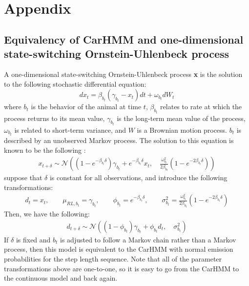 
\renewcommand*{\thesubsection}{\Alph{subsection}}

\section*{Appendix}

\setcounter{subsection}{0}

\subsection{Equivalency of CarHMM and one-dimensional state-switching Ornstein-Uhlenbeck process}

A one-dimensional state-switching Ornstein-Uhlenbeck process \textbf{x} is the solution to the following stochastic differential equation:
%
$$dx_t = \beta_{b_t}(\gamma_{b_t} - x_t)dt + \omega_{b_t} dW_t$$
%
where $b_t$ is the behavior of the animal at time $t$, $\beta_{b_t}$ relates to rate at which the process returns to its mean value, $\gamma_{b_t}$ is the long-term mean value of the process, $\omega_{b_t}$ is related to short-term variance, and $W$ is a Brownian motion process. $b_t$ is described by an unobserved Markov process. The solution to this equation is known to be the following \cite{Michelot:2019}:
\begin{align*}
	x_{t+\delta} \sim \mathcal{N}\left((1-e^{-\beta_{b_t}\delta})\gamma_{b_t} + e^{-\beta_{b_t}\delta} x_t,\quad \frac{\omega_{b_t}^2}{2\beta_{b_t}} (1-e^{-2\beta_{b_t}\delta})\right)
\end{align*}
suppose that $\delta$ is constant for all observations, and introduce the following transformations:
\begin{align*}
	d_t = x_t, \qquad \mu_{RL,b_t} = \gamma_{b_t}, \qquad \phi_{b_t} = e^{-\beta_{b_t}\delta}, \qquad \sigma^2_{b_t} = \frac{\omega_{b_t}^2}{2\beta_{b_t}} (1-e^{-2\beta_{b_t}\delta})
\end{align*}
Then, we have the following:
\begin{align*}
	d_{t+\delta} \sim \mathcal{N}\left((1-\phi_{b_t})\gamma_{b_t} + \phi_{b_t} d_t,\quad \sigma_{b_t}^2 \right)
\end{align*}
%
If $\delta$ is fixed and $b_t$ is adjusted to follow a Markov chain rather than a Markov process, then this model is equivalent to the CarHMM with normal emission probabilities for the step length sequence. Note that all of the parameter transformations above are one-to-one, so it is easy to go from the CarHMM to the continuous model and back again.

